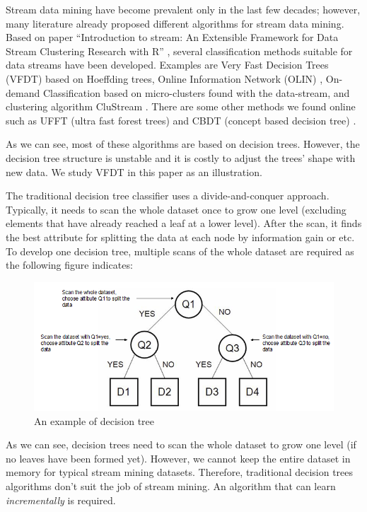 \documentclass[conference]{IEEEtran}
\begin{document}
Stream data mining have become prevalent only in the last few decades; however, many literature already proposed different algorithms for stream data mining. Based on paper ``Introduction to stream: An Extensible Framework for Data Stream Clustering Research with R'' \cite{Rstream}, several classification methods suitable for data streams have been developed. Examples are Very Fast Decision Trees (VFDT) \cite{VFDT} based on Hoeffding trees, Online Information Network (OLIN)  \cite{last}, On-demand Classification \cite{Aggarwal04} based on micro-clusters found with the data-stream, and clustering algorithm CluStream \cite{ggarwal03}. There are some other methods we found online such as UFFT (ultra fast forest trees) \cite{gama} and CBDT (concept based decision tree) \cite{CBDT}.  

As we can see, most of these algorithms are based on decision trees. However, the decision tree structure is unstable and it is costly to adjust the trees' shape with new data. We study VFDT in this paper as an illustration.

The traditional decision tree classifier uses a divide-and-conquer approach. Typically, it needs to scan the whole dataset once to grow one level (excluding elements that have already reached a leaf at a lower level). After the scan, it finds the best attribute for splitting the data at each node by information gain or etc. To develop one decision tree, multiple scans of the whole dataset are required as the following figure indicates:
\begin{figure}[H]
	\centering
	\includegraphics[width=\linewidth]{figures/decision_tree}
	\caption{An example of decision tree}
	\label{fig:tree}
\end{figure}

As we can see, decision trees need to scan the whole dataset to grow one level (if no leaves have been formed yet). However, we cannot keep the entire dataset in memory for typical stream mining datasets. Therefore, traditional decision trees algorithms don't suit the job of stream mining. An algorithm that can learn \emph{incrementally} is required.
\end{document}

